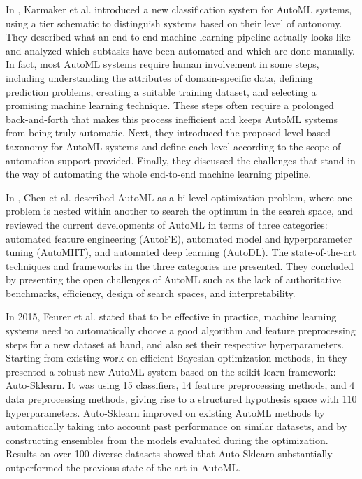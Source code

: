 In \cite{Karmaker2021}, Karmaker et al. introduced a new classification system for AutoML systems, using a tier schematic to distinguish systems based on their level of autonomy.
They described what an end-to-end machine learning pipeline actually looks like and analyzed which subtasks have been automated and which are done manually.
In fact, most AutoML systems require human involvement in some steps, including understanding the attributes of domain-specific data, defining prediction problems, creating a suitable training dataset, and selecting a promising machine learning technique.
These steps often require a prolonged back-and-forth that makes this process inefficient and keeps AutoML systems from being truly automatic.
Next, they introduced the proposed level-based taxonomy for AutoML systems and define each level according to the scope of automation support provided.
Finally, they discussed the challenges that stand in the way of automating the whole end-to-end machine learning pipeline.

In \cite{Chen2021}, Chen et al. described AutoML as a bi-level optimization problem, where one problem is nested within another to search the optimum in the search space, and reviewed the current developments of AutoML in terms of three categories:
automated feature engineering (AutoFE),
automated model and hyperparameter tuning (AutoMHT),
and automated deep learning (AutoDL).
The state-of-the-art techniques and frameworks in the three categories are presented.
They concluded by presenting the open challenges of AutoML such as the lack of authoritative benchmarks, efficiency, design of search spaces, and interpretability.

In 2015, Feurer et al. stated that to be effective in practice, machine learning systems need to automatically choose a good algorithm and feature preprocessing steps for a new dataset at hand, and also set their respective hyperparameters.
Starting from existing work on efficient Bayesian optimization methods, in \cite{Feurer2015} they presented a robust new AutoML system based on the scikit-learn framework: Auto-Sklearn.
It was using 15 classifiers, 14 feature preprocessing methods, and 4 data preprocessing methods, giving rise to a structured hypothesis space with 110 hyperparameters.
Auto-Sklearn improved on existing AutoML methods by automatically taking into account past performance on similar datasets, and by constructing ensembles from the models evaluated during the optimization.
Results on over 100 diverse datasets showed that Auto-Sklearn substantially outperformed the previous state of the art in AutoML.

